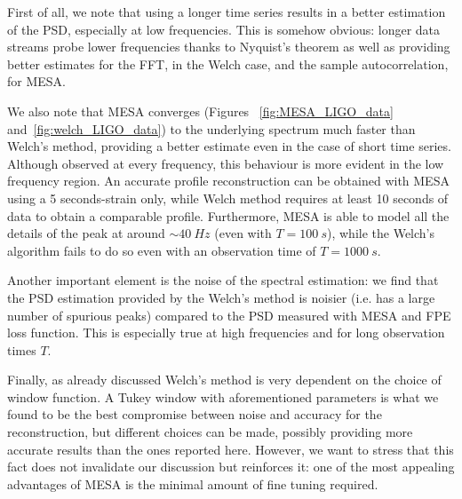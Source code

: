 \documentclass{aa}
\begin{document}
First of all, we note that using a longer time series results in a better estimation of the PSD, especially at low frequencies. 
This is somehow obvious: longer data streams probe lower frequencies thanks to Nyquist's theorem as well as providing better estimates for the FFT, in the Welch case, and the sample autocorrelation, for MESA.

We also note that MESA converges (Figures ~\ref{fig:MESA_LIGO_data} and~\ref{fig:welch_LIGO_data}) to the underlying spectrum much faster than Welch's method, providing a better estimate even in the case of short time series. Although observed at every frequency, this behaviour is more evident in the low frequency region. An accurate profile reconstruction can be obtained with MESA using a 5 seconds-strain only, while Welch method requires at least 10 seconds of data to obtain a comparable profile.
Furthermore, MESA is able to model all the details of the peak at around $\sim \SI{40}{Hz}$ (even with $T=\SI{100}{s}$), while the Welch's algorithm fails to do so even with an observation time of $T=\SI{1000}{s}$.

Another important element is the noise of the spectral estimation: we find that the PSD estimation provided by the Welch's method is noisier (i.e. has a large number of spurious peaks) compared to the PSD measured with MESA and FPE loss function. This is especially true at high frequencies and for long observation times $T$.

Finally, as already discussed Welch's method is very dependent on the choice of window function. 
A Tukey window with aforementioned parameters is what we found to be the best compromise between noise 
and accuracy for the reconstruction, but different choices can be made, possibly providing more accurate results than the ones reported here. 
However, we want to stress that this fact does not invalidate our discussion but reinforces it: one of the most appealing advantages of MESA is the minimal amount of fine tuning required.
\end{document}

